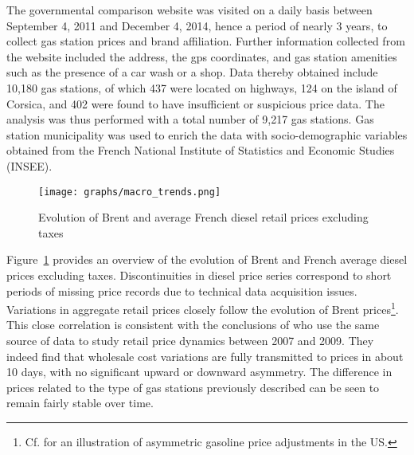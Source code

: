 \documentclass[english]{article}
\begin{document}
The governmental comparison website was visited on a daily basis between September 4, 2011 and December 4, 2014, hence a period of nearly 3 years, to collect gas station prices and brand affiliation. Further information collected from the website included the address, the gps coordinates, and gas station amenities such as the presence of a car wash or a shop. Data thereby obtained include 10,180 gas stations, of which 437 were located on highways, 124 on the island of Corsica, and 402 were found to have insufficient or suspicious price data. The analysis was thus performed with a total number of 9,217 gas stations. Gas station municipality was used to enrich the data with socio-demographic variables obtained from the French National Institute of Statistics and Economic Studies (INSEE).

\begin{figure}%
    \caption{Evolution of Brent and average French diesel retail prices excluding taxes}
	\centering
		\texttt{[image: graphs/macro\_trends.png]}
\label{fig:brent_and_diesel}
\end{figure}

Figure~\ref{fig:brent_and_diesel} provides an overview of the evolution of Brent and French average diesel prices excluding taxes. Discontinuities in diesel price series correspond to short periods of missing price records due to technical data acquisition issues. Variations in aggregate retail prices closely follow the evolution of Brent prices\footnote{Cf. \cite{LEW11b} for an illustration of asymmetric gasoline price adjustments in the US.}. This close correlation is consistent with the conclusions of \cite{GAU15} who use the same source of data to study retail price dynamics between 2007 and 2009. They indeed find that wholesale cost variations are fully transmitted to prices in about 10 days, with no significant upward or downward asymmetry. The difference in prices related to the type of gas stations previously described can be seen to remain fairly stable over time.
\end{document}
